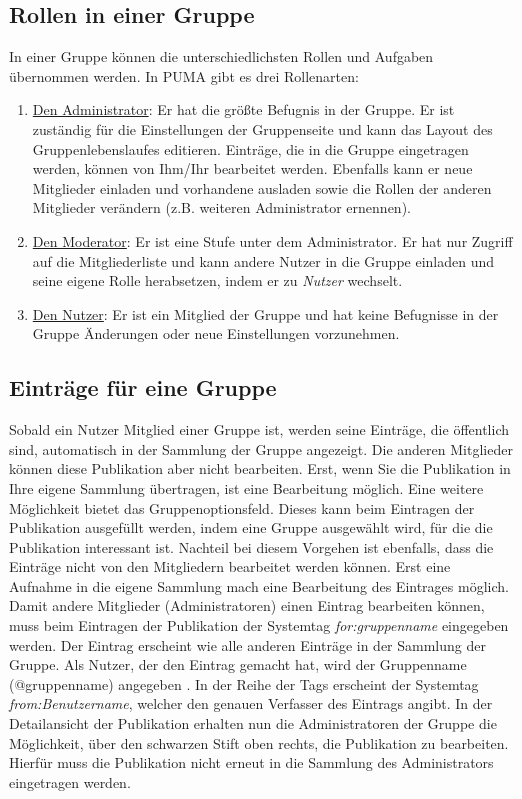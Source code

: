 \subsection{Rollen in einer Gruppe}
In einer Gruppe können die unterschiedlichsten Rollen und Aufgaben übernommen werden. In PUMA gibt es drei Rollenarten:
\begin{enumerate}
    \item \underline{Den Administrator}: Er hat die größte Befugnis in der Gruppe. Er ist zuständig für die Einstellungen der Gruppenseite und kann das Layout des Gruppenlebenslaufes editieren. Einträge, die in die Gruppe eingetragen werden, können von Ihm/Ihr bearbeitet werden. Ebenfalls kann er neue Mitglieder einladen und vorhandene ausladen sowie die Rollen der anderen Mitglieder verändern (z.B. weiteren Administrator ernennen).
    \item \underline{Den Moderator}: Er ist eine Stufe unter dem Administrator. Er hat nur Zugriff auf die Mitgliederliste und kann andere Nutzer in die Gruppe einladen und seine eigene Rolle herabsetzen, indem er zu \textit{Nutzer} wechselt.
    \item \underline{Den Nutzer}: Er ist ein Mitglied der Gruppe und hat keine Befugnisse in der Gruppe Änderungen oder neue Einstellungen vorzunehmen.
\end{enumerate}
\subsection{Einträge für eine Gruppe}
Sobald ein Nutzer Mitglied einer Gruppe ist, werden seine Einträge, die öffentlich sind, automatisch in der Sammlung der Gruppe angezeigt. Die anderen Mitglieder können diese Publikation aber nicht bearbeiten. Erst, wenn Sie die Publikation in Ihre eigene Sammlung übertragen, ist eine Bearbeitung möglich. Eine weitere Möglichkeit bietet das Gruppenoptionsfeld. Dieses kann beim Eintragen der Publikation ausgefüllt werden, indem eine Gruppe ausgewählt wird, für die die Publikation interessant ist. Nachteil bei diesem Vorgehen ist ebenfalls, dass die Einträge nicht von den Mitgliedern bearbeitet werden können. Erst eine Aufnahme in die eigene Sammlung mach eine Bearbeitung des Eintrages möglich.\newline  
Damit andere Mitglieder (Administratoren) einen Eintrag bearbeiten können, muss beim Eintragen der Publikation der Systemtag \textit{for:gruppenname} eingegeben werden. Der Eintrag erscheint wie alle anderen Einträge in der Sammlung der Gruppe. Als Nutzer, der den Eintrag gemacht hat, wird der Gruppenname (@gruppenname) angegeben . In der Reihe der Tags erscheint der Systemtag \textit{from:Benutzername}, welcher den genauen Verfasser des Eintrags angibt. In der Detailansicht der Publikation erhalten nun die Administratoren der Gruppe die Möglichkeit, über den schwarzen Stift oben rechts, die Publikation zu bearbeiten. Hierfür muss die Publikation nicht erneut in die Sammlung des Administrators eingetragen werden.

